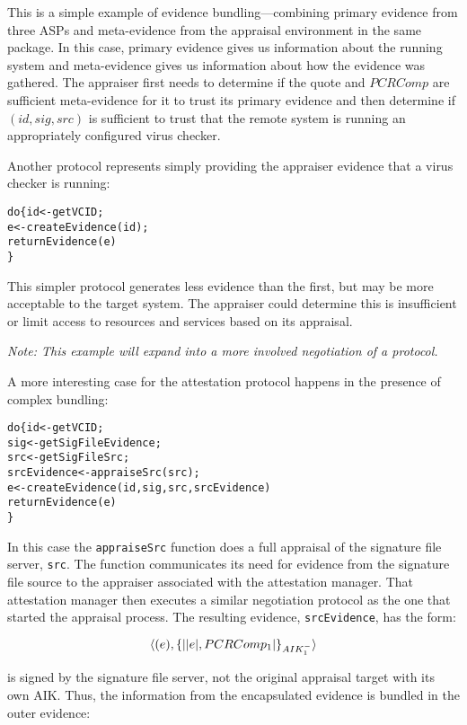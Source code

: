 \documentclass[10pt]{article}
\begin{document}
This is a simple example of evidence bundling---combining primary
evidence from three ASPs and meta-evidence from the appraisal
environment in the same package.  In this case, primary evidence gives
us information about the running system and meta-evidence gives us
information about how the evidence was gathered.  The appraiser first
needs to determine if the quote and $PCRComp$ are sufficient
meta-evidence for it to trust its primary evidence and then determine
if $(id,sig,src)$ is sufficient to trust that the remote system is
running an appropriately configured virus checker.

Another protocol represents simply providing the appraiser evidence
that a virus checker is running:

\begin{alltt}
  do \{ id <- getVCID;
       e <- createEvidence(id);
       returnEvidence(e)
  \}
\end{alltt}

This simpler protocol generates less evidence than the first, but may
be more acceptable to the target system.  The appraiser could
determine this is insufficient or limit access to resources and
services based on its appraisal.

\emph{Note: This example will expand into a more involved negotiation
  of a protocol.}

A more interesting case for the attestation protocol happens in the
presence of complex bundling:

\begin{alltt}
  do \{ id <- getVCID;
       sig <- getSigFileEvidence;
       src <- getSigFileSrc;
       srcEvidence <- appraiseSrc(src);
       e <- createEvidence(id,sig,src,srcEvidence)
       returnEvidence(e)
  \}
\end{alltt}

In this case the \Verb+appraiseSrc+ function does a full appraisal of
the signature file server, \Verb+src+. The function communicates its
need for evidence from the signature file source to the appraiser
associated with the attestation manager.  That attestation manager
then executes a similar negotiation protocol as the one that started
the appraisal process.  The resulting evidence, \Verb+srcEvidence+,
has the form:

\[\langle (e),\{\lvert \lvert e \rvert,PCRComp_1\rvert\}_{AIK_1^{-}}\rangle\]

is signed by the signature file server, not the original appraisal
target with its own AIK. Thus, the information from the encapsulated
evidence is bundled in the outer evidence:
\end{document}

